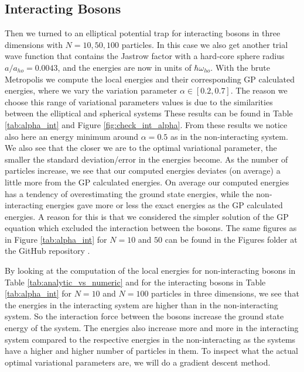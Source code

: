 \documentclass[12pt,a4paper,english]{article}
\begin{document}
\subsection{Interacting Bosons}
\label{subsect:Results_int}
Then we turned to an elliptical potential trap for interacting bosons in three dimensions with $N=10,50,100$ particles. In this case we also get another trial wave function that contains the Jastrow factor with a hard-core sphere radius $a/a_{ho}=0.0043$, and the energies are now in units of $\hbar\omega_{ho}$. With the brute Metropolis we compute the local energies and their corresponding GP calculated energies, where we vary the variation parameter $\alpha\in[0.2,0.7]$. The reason we choose this range of variational parameters values is due to the similarities between the elliptical and spherical systems These results can be found in Table \ref{tab:alpha_int} and Figure \ref{fig:check_int_alpha}. From these results we notice also here an energy minimum around $\alpha=0.5$ as in the non-interacting system. We also see that the closer we are to the optimal variational parameter, the smaller the standard deviation/error in the energies become. As the number of particles increase, we see that our computed energies deviates (on average) a little more from the GP calculated energies. On average our computed energies has a tendency of overestimating the ground state energies, while the non-interacting energies gave more or less the exact energies as the GP calculated energies. A reason for this is that we considered the simpler solution of the GP equation which excluded the interaction between the bosons. The same figures as in Figure \ref{tab:alpha_int} for $N=10$ and $50$ can be found in the Figures folder at the GitHub repository \cite{GitHub}.

By looking at the computation of the local energies for non-interacting bosons in Table \ref{tab:analytic_vs_numeric} and for the interacting bosons in Table \ref{tab:alpha_int} for $N=10$ and $N=100$ particles in three dimensions, we see that the energies in the interacting system are higher than in the non-interacting system. So the interaction force between the bosons increase the ground state energy of the system. The energies also increase more and more in the interacting system compared to the respective energies in the non-interacting as the systems have a higher and higher number of particles in them. To inspect what the actual optimal variational parameters are, we will do a gradient descent method.
\end{document}
